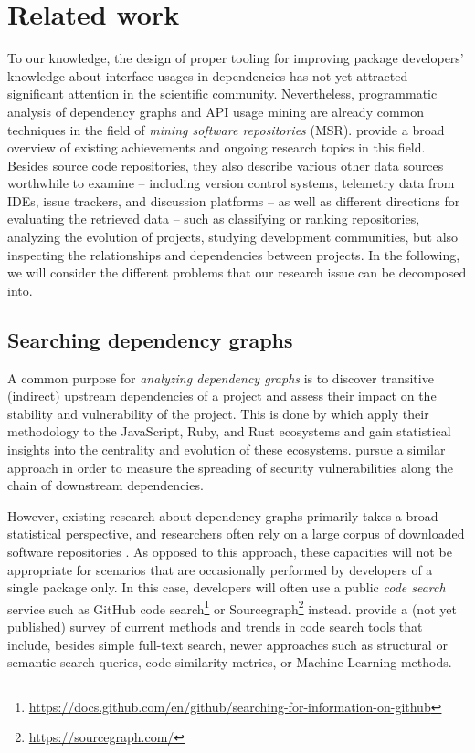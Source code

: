 \section{Related work}
\label{sec:related_work}

To our knowledge, the design of proper tooling for improving package developers' knowledge about interface usages in dependencies has not yet attracted significant attention in the scientific community.
Nevertheless, programmatic analysis of dependency graphs and API usage mining are already common techniques in the field of \emph{mining software repositories} (MSR).
\citet{chaturvedi2013tools} provide a broad overview of existing achievements and ongoing research topics in this field.
Besides source code repositories, they also describe various other data sources worthwhile to examine -- including version control systems, telemetry data from IDEs, issue trackers, and discussion platforms -- as well as different directions for evaluating the retrieved data -- such as classifying or ranking repositories, analyzing the evolution of projects, studying development communities, but also inspecting the relationships and dependencies between projects.
In the following, we will consider the different problems that our research issue can be decomposed into.

\subsection{Searching dependency graphs}
\label{sec:related_work/dependencies}

A common purpose for \emph{analyzing dependency graphs} is to discover transitive (indirect) upstream dependencies of a project and assess their impact on the stability and vulnerability of the project.
This is done by \citet{kikas2017structure} which apply their methodology to the JavaScript, Ruby, and Rust ecosystems and gain statistical insights into the centrality and evolution of these ecosystems.
\citet{decan2018impact} pursue a similar approach in order to measure the spreading of security vulnerabilities along the chain of downstream dependencies.

However, existing research about dependency graphs primarily takes a broad statistical perspective, and researchers often rely on a large corpus of downloaded software repositories \citep{abdalkareem2017developers,katz2020libraries,kikas2017structure}.
As opposed to this approach, these capacities will not be appropriate for scenarios that are occasionally performed by developers of a single package only.
In this case, developers will often use a public \emph{code search} service such as GitHub code search\footnote{\url{https://docs.github.com/en/github/searching-for-information-on-github}} or Sourcegraph\footnote{\url{https://sourcegraph.com/}} instead.
\citet{liu2020opportunities} provide a (not yet published) survey of current methods and trends in code search tools that include, besides simple full-text search, newer approaches such as structural or semantic search queries, code similarity metrics, or Machine Learning methods.

